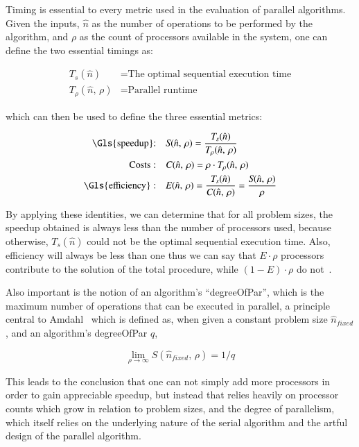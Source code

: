 Timing is essential to every metric used in the evaluation of parallel algorithms. Given the inputs, $\hat{n}$ as the number of operations to be performed by the algorithm, and $\rho$ as the count of processors available in the system, one can define the two essential timings as:

\begin{align}
	\mathit{T_s}(\hat{n}) &= \text{The optimal sequential execution time} \\
	\mathit{T_{\rho}}(\hat{n},\,\rho) &= \text{Parallel runtime}
	\label{eq:timings}
\end{align}

which can then be used to define the three essential metrics:

\begin{align}
	\text{\Gls{speedup}:}\quad&\mathit{S}(\hat{n},\,\rho) = \frac{\mathit{T_s}(\hat{n})}{\mathit{T_{\rho}}(\hat{n},\,\rho)} \\
	\text{Costs}:\quad&\mathit{C}(\hat{n},\,\rho) =\rho\cdot\mathit{T_{\rho}}(\hat{n},\,\rho) \\
	\text{\Gls{efficiency}}:\quad&\mathit{E}(\hat{n},\,\rho) = \frac{\mathit{T_s}(\hat{n})}{\mathit{C}(\hat{n},\,\rho)} = \frac{\mathit{S}(\hat{n},\,\rho)}{\rho}
	\label{eq:essentialMetrics}
\end{align}

By applying these identities, we can determine that for all problem sizes, the \gls{speedup} obtained is always less than the number of processors used, because otherwise, $\mathit{T_s}(\hat{n})$ could not be the optimal sequential execution time. Also, \gls{efficiency} will always be less than one thus we can say that $\mathit{E}\cdot\rho$ processors contribute to the solution of the total procedure, while $(1-\mathit{E})\cdot\rho$ do not~\cite[p.~335]{Lang17}.

Also important is the notion of an algorithm's ``\gls{degreeOfPar}'', which is the maximum number of operations that can be executed in parallel, a principle central to \gls{Amdahl}~\cite{Amdahl67} which is defined as, when given a constant problem size $\hat{n}_{fixed}$, and an algorithm's \gls{degreeOfPar} $q$,

\begin{equation}
	\lim_{\rho \to \infty} \mathit{S}(\hat{n}_{fixed},\,\rho) = 1 / q
\end{equation}

This leads to the conclusion that one can not simply add more processors in order to gain appreciable speedup, but instead that relies heavily on processor counts which grow in relation to problem sizes, and the degree of parallelism, which itself relies on the underlying nature of the serial algorithm and the artful design of the parallel algorithm.

